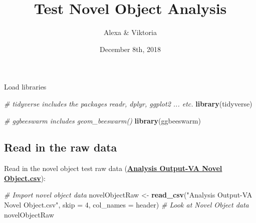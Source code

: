 \documentclass[]{article}
\title{Test Novel Object Analysis}
\author{Alexa \& Viktoria}
\date{December 8th, 2018}
\newenvironment{Shaded}{\begin{snugshade}}{\end{snugshade}}
\newcommand{\KeywordTok}[1]{\textcolor[rgb]{0.13,0.29,0.53}{\textbf{#1}}}
\newcommand{\DataTypeTok}[1]{\textcolor[rgb]{0.13,0.29,0.53}{#1}}
\newcommand{\DecValTok}[1]{\textcolor[rgb]{0.00,0.00,0.81}{#1}}
\newcommand{\StringTok}[1]{\textcolor[rgb]{0.31,0.60,0.02}{#1}}
\newcommand{\CommentTok}[1]{\textcolor[rgb]{0.56,0.35,0.01}{\textit{#1}}}
\newcommand{\NormalTok}[1]{#1}
\begin{document}
\maketitle

Load libraries

\begin{Shaded}
\begin{Highlighting}[]
\CommentTok{# tidyverse includes the packages readr, dplyr, ggplot2 ... etc.}
\KeywordTok{library}\NormalTok{(tidyverse)}

\CommentTok{# ggbeeswarm includes geom_beeswarm()}
\KeywordTok{library}\NormalTok{(ggbeeswarm)}
\end{Highlighting}
\end{Shaded}

\subsection{Read in the raw data}\label{read-in-the-raw-data}

Read in the novel object test raw data
(\href{Analysis\%20Output-VA\%20Novel\%20Object.csv}{\textbf{Analysis
Output-VA Novel Object.csv}}):

\begin{Shaded}
\begin{Highlighting}[]
\CommentTok{# Import novel object data}
\NormalTok{novelObjectRaw <-}\StringTok{ }\KeywordTok{read_csv}\NormalTok{(}\StringTok{"Analysis Output-VA Novel Object.csv"}\NormalTok{, }\DataTypeTok{skip =} \DecValTok{4}\NormalTok{, }
                            \DataTypeTok{col_names =}\NormalTok{ header)}
\CommentTok{# Look at Novel Object data}
\NormalTok{novelObjectRaw}
\end{Highlighting}
\end{Shaded}
\end{document}
